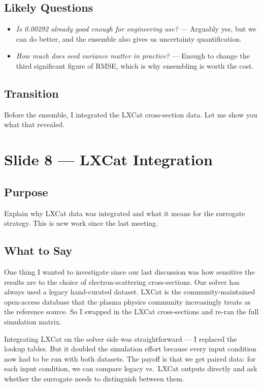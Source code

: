 \documentclass[12pt,a4paper]{article}
\begin{document}
\subsection*{Likely Questions}
\begin{itemize}
  \item \emph{Is 0.00292 already good enough for engineering use?}
    --- Arguably yes, but we can do better, and the ensemble also
    gives us uncertainty quantification.
  \item \emph{How much does seed variance matter in practice?}
    --- Enough to change the third significant figure of RMSE, which
    is why ensembling is worth the cost.
\end{itemize}

\subsection*{Transition}
Before the ensemble, I integrated the LXCat cross-section data.
Let me show you what that revealed.

\clearpage

\section{Slide 8 --- LXCat Integration}
\label{sec:slide8}

\subsection*{Purpose}
Explain why LXCat data was integrated and what it means for the
surrogate strategy. This is new work since the last meeting.

\subsection*{What to Say}

One thing I wanted to investigate since our last discussion was how
sensitive the results are to the choice of electron-scattering
cross-sections. Our solver has always used a legacy hand-curated
dataset. LXCat is the community-maintained open-access database that
the plasma physics community increasingly treats as the reference
source. So I swapped in the LXCat cross-sections and re-ran the full
simulation matrix.

Integrating LXCat on the solver side was straightforward --- I
replaced the lookup tables. But it doubled the simulation effort
because every input condition now had to be run with both datasets.
The payoff is that we get paired data: for each input condition, we
can compare legacy vs.\ LXCat outputs directly and ask whether the
surrogate needs to distinguish between them.
\end{document}
